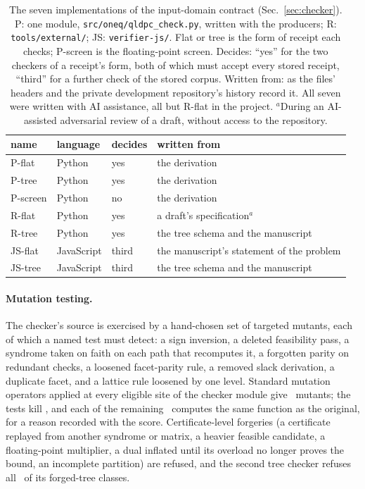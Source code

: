 \documentclass[aps,pra,twocolumn,superscriptaddress,nofootinbib,longbibliography,floatfix]{revtex4-2}
\begin{document}
\begin{table}[tbp]
\caption{The seven implementations of the input-domain contract (Sec.~\ref{sec:checker}). P: one module, \nolinkurl{src/oneq/qldpc_check.py}, written with the producers; R: \nolinkurl{tools/external/}; JS: \nolinkurl{verifier-js/}. Flat or tree is the form of receipt each checks; P-screen is the floating-point screen. Decides: ``yes'' for the two checkers of a receipt's form, both of which must accept every stored receipt, ``third'' for a further check of the stored corpus. Written from: as the files' headers and the private development repository's history record it. All seven were written with AI assistance, all but R-flat in the project. $^a$During an AI-assisted adversarial review of a draft, without access to the repository.}
\label{tab:checkers}
\small\setlength{\tabcolsep}{3pt}
\begin{tabular}{@{}lllp{3.85cm}@{}}
\toprule
name & language & decides & written from \\
\midrule
P-flat & Python & yes & \raggedright the derivation\tabularnewline
P-tree & Python & yes & \raggedright the derivation\tabularnewline
P-screen & Python & no & \raggedright the derivation\tabularnewline
R-flat & Python & yes & \raggedright a draft's specification$^a$\tabularnewline
R-tree & Python & yes & \raggedright the tree schema and the manuscript\tabularnewline
JS-flat & JavaScript & third & \raggedright the manuscript's statement of the problem\tabularnewline
JS-tree & JavaScript & third & \raggedright the tree schema and the manuscript\tabularnewline
\bottomrule
\end{tabular}
\end{table}

\paragraph*{Mutation testing.} The checker's source is exercised by a hand-chosen set of targeted mutants, each of which a named test must detect: a sign inversion, a deleted feasibility pass, a syndrome taken on faith on each path that recomputes it, a forgotten parity on redundant checks, a loosened facet-parity rule, a removed slack derivation, a duplicate facet, and a lattice rule loosened by one level. Standard mutation operators applied at every eligible site of the checker module give \MutQRun\ mutants; the tests kill \MutQKilled, and each of the remaining \MutQEquivalent\ computes the same function as the original, for a reason recorded with the score. Certificate-level forgeries (a certificate replayed from another syndrome or matrix, a heavier feasible candidate, a floating-point multiplier, a dual inflated until its overload no longer proves the bound, an incomplete partition) are refused, and the second tree checker refuses all \TreeMutants\ of its forged-tree classes.
\end{document}
